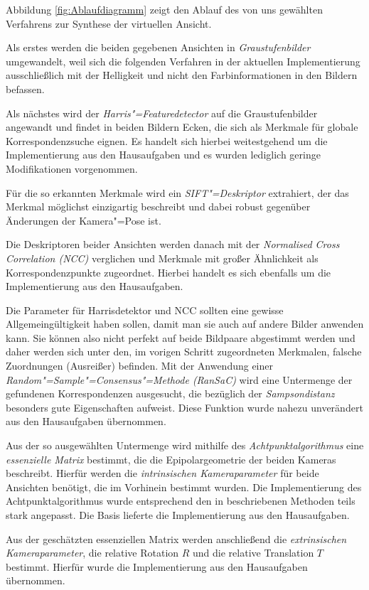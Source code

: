 Abbildung \ref{fig:Ablaufdiagramm} zeigt den Ablauf des von uns gewählten Verfahrens zur Synthese der virtuellen Ansicht.

Als erstes werden die beiden gegebenen Ansichten in \textit{Graustufenbilder} umgewandelt, weil sich die folgenden Verfahren in der aktuellen Implementierung ausschließlich mit der Helligkeit und nicht den Farbinformationen in den Bildern befassen.

Als nächstes wird der \textit{Harris"=Featuredetector} auf die Graustufenbilder angewandt und findet in beiden Bildern Ecken, die sich als Merkmale für globale Korrespondenzsuche eignen. Es handelt sich hierbei weitestgehend um die Implementierung aus den Hausaufgaben und es wurden lediglich geringe Modifikationen vorgenommen.

Für die so erkannten Merkmale wird ein \textit{SIFT"=Deskriptor} extrahiert, der das Merkmal möglichst einzigartig beschreibt und dabei robust gegenüber Änderungen der Kamera"=Pose ist.

Die Deskriptoren beider Ansichten werden danach mit der \textit{Normalised Cross Correlation (NCC)} verglichen und Merkmale mit großer Ähnlichkeit als Korrespondenzpunkte zugeordnet. Hierbei handelt es sich ebenfalls um die Implementierung aus den Hausaufgaben.

Die Parameter für Harrisdetektor und NCC sollten eine gewisse Allgemeingültigkeit haben sollen, damit man sie auch auf andere Bilder anwenden kann. Sie können also nicht perfekt auf beide Bildpaare abgestimmt werden und daher werden sich unter den, im vorigen Schritt zugeordneten Merkmalen, falsche Zuordnungen (Ausreißer) befinden. Mit der Anwendung einer \textit{Random"=Sample"=Consensus"=Methode (RanSaC)} wird eine Untermenge der gefundenen Korrespondenzen ausgesucht, die bezüglich der \textit{Sampsondistanz} besonders gute Eigenschaften aufweist. Diese Funktion wurde nahezu unverändert aus den Hausaufgaben übernommen.

Aus der so ausgewählten Untermenge wird mithilfe des \textit{Achtpunktalgorithmus} eine \textit{essenzielle Matrix} bestimmt, die die Epipolargeometrie der beiden Kameras beschreibt. Hierfür werden die \textit{intrinsischen Kameraparameter} für beide Ansichten benötigt, die im Vorhinein bestimmt wurden. Die Implementierung des Achtpunktalgorithmus wurde entsprechend den in \cite{Ma} beschriebenen Methoden teils stark angepasst. Die Basis lieferte die Implementierung aus den Hausaufgaben.

Aus der geschätzten essenziellen Matrix werden anschließend die \textit{extrinsischen Kameraparameter}, die relative Rotation $R$ und die relative Translation $T$ bestimmt. Hierfür wurde die Implementierung aus den Hausaufgaben übernommen.

